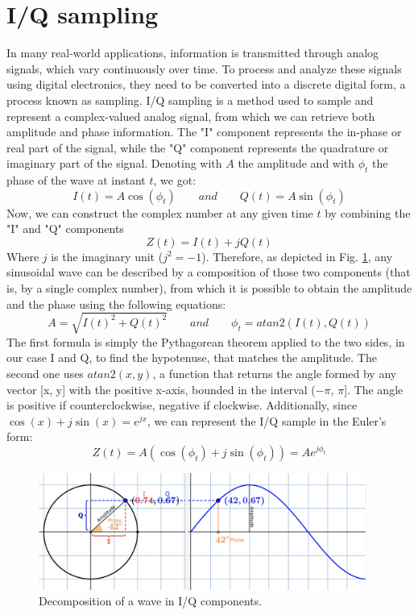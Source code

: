 \documentclass[binding=0.7cm, oneside]{sapthesis}
\begin{document}
\section{I/Q sampling}
\label{sec:IQ}
In many real-world applications, information is transmitted through analog signals, which vary continuously over time. To process and analyze these signals
using digital electronics, they need to be converted into a discrete digital form, a process known as sampling. I/Q sampling is a method used to sample
and represent a complex-valued analog signal, from which we can retrieve both amplitude and phase information. The "I" component represents the in-phase
or real part of the signal, while the "Q" component represents the quadrature or imaginary part of the signal. Denoting with $A$ the amplitude and with
$\phi_t$ the phase of the wave at instant $t$, we got:
$$ I(t) = A\cos(\phi_t) \qquad and \qquad Q(t) = A\sin(\phi_t)$$
Now, we can construct the complex number at any given time $t$ by combining the "I" and "Q" components
$$Z(t) = I(t) + jQ(t)$$
Where $j$ is the imaginary unit ($j^2 = -1$). Therefore, as depicted in Fig. \ref{fig:IQ_sample}, any sinusoidal wave can be
described by a composition of those two components (that is, by a single complex number), from which it is possible
to obtain the amplitude and the phase using the following equations:
$$ A = \sqrt{I(t)^2 + Q(t)^2} \qquad and \qquad \phi_t = atan2(I(t), Q(t)) $$
The first formula is simply the Pythagorean theorem applied to the two sides, in our case I and Q, to find the hypotenuse, that matches the amplitude.
The second one uses $atan2(x,y)$, a function that returns the angle formed by any vector [x, y] with the positive x-axis, bounded in the interval ($-\pi$, $\pi$].
The angle is positive if counterclockwise, negative if clockwise. Additionally, since $\cos(x) + j\sin(x) = e^{jx}$, we can represent the I/Q sample in the Euler's form:
$$Z(t) = A(\cos(\phi_t) + j\sin(\phi_t)) = Ae^{j\phi_t}$$
\begin{figure}[h]
    \centering
    \includegraphics[width=0.96\textwidth]{images/IQ_sampling.jpg}
    \caption{Decomposition of a wave in I/Q components.}
    \label{fig:IQ_sample}
\end{figure}
\end{document}
